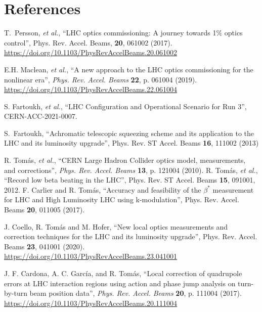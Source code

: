 \documentclass{cernatsnote}
\begin{document}
\section{References}
\begin{thebibliography}{99} %


 T.~Persson, {\it et al.}, ``LHC optics commissioning: A journey towards 1$\%$ optics control'', Phys. Rev. Accel. Beams, \textbf{20}, 061002 (2017).
\url{https://doi.org/10.1103/PhysRevAccelBeams.20.061002}

 E.H. Maclean, {\it et al.}, ``A new approach to the LHC optics commissioning for the nonlinear era'', {\it Phys. Rev. Accel. Beams}  {\bf 22}, p. 061004 (2019).\vspace{-0.03cm}
\url{https://doi.org/10.1103/PhysRevAccelBeams.22.061004}

 S. Fartoukh, {\it et al.}, 
	``LHC Configuration and Operational Scenario for Run 3'', CERN-ACC-2021-0007.
	
S.~Fartoukh, ``Achromatic telescopic squeezing scheme and its application to the LHC and its luminosity upgrade'', Phys. Rev. ST Accel. Beams {\bf16}, 111002 (2013)

R. Tomás, {\it et al.}, “CERN Large Hadron Collider optics
model, measurements, and corrections”, {\it Phys. Rev. Accel. Beams}  {\bf 13}, p. 121004 (2010).
%
 R. Tom\'as, {\it et al.}, ``Record low beta beating in the LHC'',
Phys. Rev. ST Accel. Beams {\bf15}, 091001, 2012.
%
 F. Carlier and R. Tom\'as, ``Accuracy and feasibility of the $\beta^*$ measurement for LHC and High Luminosity LHC using k-modulation'',
Phys. Rev. Accel. Beams {\bf20}, 011005 (2017).
%


J. Coello, R. Tom\'as and M. Hofer, ``New local optics measurements and correction techniques for the LHC and its luminosity upgrade'', Phys. Rev. Accel. Beams {\bf 23}, 041001 (2020).
\url{https://doi.org/10.1103/PhysRevAccelBeams.23.041001}

 J. F.  Cardona, A. C. Garc\'ia, and R. Tom\'as, ``Local correction of quadrupole errors at LHC interaction regions using action and phase jump analysis on turn-by-turn beam position data'', {\it Phys. Rev. Accel. Beams} {\bf 20}, p. 111004 (2017).
\url{https://doi.org/10.1103/PhysRevAccelBeams.20.111004}


\end{thebibliography}
\end{document}

